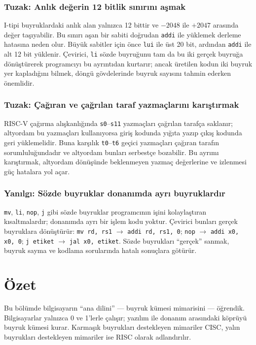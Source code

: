 \subsubsection*{Tuzak: Anlık değerin 12 bitlik sınırını aşmak}
I-tipi buyruklardaki anlık alan yalnızca 12 bittir ve $-2048$ ile $+2047$ arasında değer taşıyabilir. Bu sınırı aşan bir sabiti doğrudan \texttt{addi} ile yüklemek derleme hatasına neden olur. Büyük sabitler için önce \texttt{lui} ile üst 20 bit, ardından \texttt{addi} ile alt 12 bit yüklenir. Çevirici, \texttt{li} sözde buyruğunu tam da bu iki gerçek buyruğa dönüştürerek programcıyı bu ayrıntıdan kurtarır; ancak üretilen kodun iki buyruk yer kapladığını bilmek, döngü gövdelerinde buyruk sayısını tahmin ederken önemlidir.

\subsubsection*{Tuzak: Çağıran ve çağrılan taraf yazmaçlarını karıştırmak}
RISC-V çağırma alışkanlığında \texttt{s0}--\texttt{s11} yazmaçları çağrılan tarafça saklanır; altyordam bu yazmaçları kullanıyorsa giriş kodunda yığıta yazıp çıkış kodunda geri yüklemelidir. Buna karşılık \texttt{t0}--\texttt{t6} geçici yazmaçları çağıran tarafın sorumluluğundadır ve altyordam bunları serbestçe bozabilir. Bu ayrımı karıştırmak, altyordam dönüşünde beklenmeyen yazmaç değerlerine ve izlenmesi güç hatalara yol açar.

\subsubsection*{Yanılgı: Sözde buyruklar donanımda ayrı buyruklardır}
\texttt{mv}, \texttt{li}, \texttt{nop}, \texttt{j} gibi sözde buyruklar programcının işini kolaylaştıran kısaltmalardır; donanımda ayrı bir işlem kodu yoktur. Çevirici bunları gerçek buyruklara dönüştürür: \texttt{mv rd, rs1} $\to$ \texttt{addi rd, rs1, 0}; \texttt{nop} $\to$ \texttt{addi x0, x0, 0}; \texttt{j etiket} $\to$ \texttt{jal x0, etiket}. Sözde buyrukları ``gerçek'' sanmak, buyruk sayma ve kodlama sorularında hatalı sonuçlara götürür.


\section{Özet}
\label{sec:bolum3-ozet}

Bu bölümde bilgisayarın ``ana dilini'' --- buyruk kümesi mimarisini --- öğrendik. Bilgisayarlar yalnızca 0 ve 1'lerle çalışır; yazılım ile donanım arasındaki köprüyü buyruk kümesi kurar. Karmaşık buyrukları destekleyen mimariler CISC, yalın buyrukları destekleyen mimariler ise RISC olarak adlandırılır.

